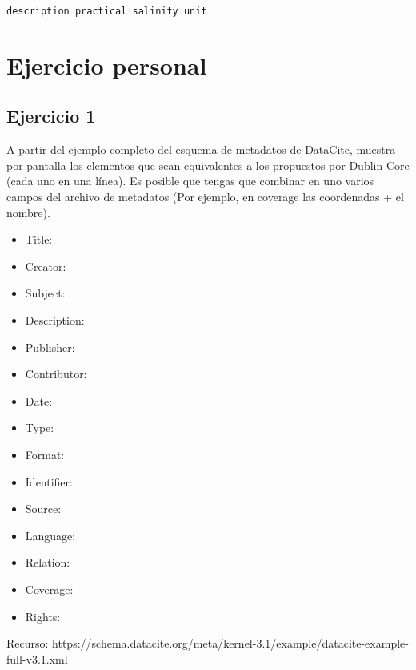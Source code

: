 \documentclass[11pt]{article}
\providecommand{\tightlist}{%
      \setlength{\itemsep}{0pt}\setlength{\parskip}{0pt}}
\begin{document}
    \begin{Verbatim}[commandchars=\\\{\}]
description practical salinity unit

    \end{Verbatim}

    \hypertarget{ejercicio-personal}{%
\section{Ejercicio personal}\label{ejercicio-personal}}

    \hypertarget{ejercicio-1}{%
\subsection{Ejercicio 1}\label{ejercicio-1}}

    A partir del ejemplo completo del esquema de metadatos de DataCite,
muestra por pantalla los elementos que sean equivalentes a los
propuestos por Dublin Core (cada uno en una línea). Es posible que
tengas que combinar en uno varios campos del archivo de metadatos (Por
ejemplo, en coverage las coordenadas + el nombre).

\begin{itemize}
\tightlist
\item
  Title:
\item
  Creator:
\item
  Subject: ~
\item
  Description:
\item
  Publisher:
\item
  Contributor:
\item
  Date:
\item
  Type:
\item
  Format:
\item
  Identifier:
\item
  Source:
\item
  Language:
\item
  Relation:
\item
  Coverage: ~
\item
  Rights:
\end{itemize}

Recurso:
https://schema.datacite.org/meta/kernel-3.1/example/datacite-example-full-v3.1.xml
\end{document}

